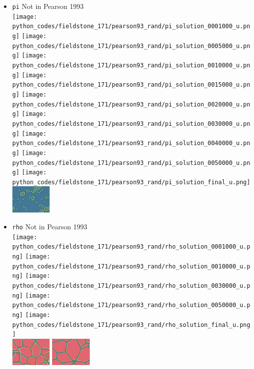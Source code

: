 \begin{itemize}
\item {\tt pi} Not in Pearson 1993\\
\texttt{[image: python\_codes/fieldstone\_171/pearson93\_rand/pi\_solution\_0001000\_u.png]}
\texttt{[image: python\_codes/fieldstone\_171/pearson93\_rand/pi\_solution\_0005000\_u.png]}
\texttt{[image: python\_codes/fieldstone\_171/pearson93\_rand/pi\_solution\_0010000\_u.png]}
\texttt{[image: python\_codes/fieldstone\_171/pearson93\_rand/pi\_solution\_0015000\_u.png]}
\texttt{[image: python\_codes/fieldstone\_171/pearson93\_rand/pi\_solution\_0020000\_u.png]}
\texttt{[image: python\_codes/fieldstone\_171/pearson93\_rand/pi\_solution\_0030000\_u.png]}
\texttt{[image: python\_codes/fieldstone\_171/pearson93\_rand/pi\_solution\_0040000\_u.png]}
\texttt{[image: python\_codes/fieldstone\_171/pearson93\_rand/pi\_solution\_0050000\_u.png]}
\texttt{[image: python\_codes/fieldstone\_171/pearson93\_rand/pi\_solution\_final\_u.png]}\\
\includegraphics[height=1.4cm]{python_codes/fieldstone_171/images/munafo_pi}

\item {\tt rho} Not in Pearson 1993\\
\texttt{[image: python\_codes/fieldstone\_171/pearson93\_rand/rho\_solution\_0001000\_u.png]}
\texttt{[image: python\_codes/fieldstone\_171/pearson93\_rand/rho\_solution\_0010000\_u.png]}
\texttt{[image: python\_codes/fieldstone\_171/pearson93\_rand/rho\_solution\_0030000\_u.png]}
\texttt{[image: python\_codes/fieldstone\_171/pearson93\_rand/rho\_solution\_0050000\_u.png]}
\texttt{[image: python\_codes/fieldstone\_171/pearson93\_rand/rho\_solution\_final\_u.png]}\\
\includegraphics[height=1.4cm]{python_codes/fieldstone_171/images/munafo_rho1}
\includegraphics[height=1.4cm]{python_codes/fieldstone_171/images/munafo_rho2}


\end{itemize}
